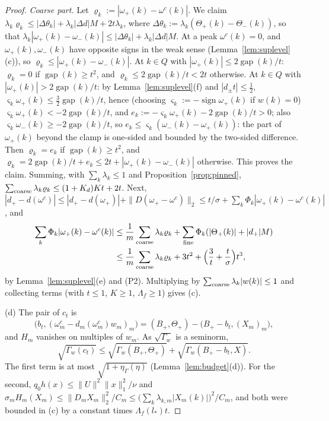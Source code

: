 \documentclass[10pt]{amsart}
\theoremstyle{definition}
\theoremstyle{remark}
\newcommand{\sgn}{\operatorname{sign}}
\newcommand{\gap}{\operatorname{gap}}
\begin{document}
\begin{proof}
\emph{Coarse part.}  Let $\varrho_k:=|\omega_+(k)-\omega^c(k)|$.  We claim
$\lambda_k\varrho_k\le|\Delta\theta_k|+\lambda_k|\Delta d|M+2t\lambda_k$, where
$\Delta\theta_k:=\lambda_k(\Theta_+(k)-\Theta_-(k))$, so that
$\lambda_k|\omega_+(k)-\omega_-(k)|\le|\Delta\theta_k|+\lambda_k|\Delta d|M$.
At a peak $\omega^c(k)=0$, and $\omega_+(k),\omega_-(k)$ have opposite signs
in the weak sense (Lemma~\ref{lem:suplevel}(c)), so $\varrho_k\le|\omega_+(k)-
\omega_-(k)|$.  At $k\in Q$ with $|\omega_+(k)|\le2\gap(k)/t$: $\varrho_k=0$ if
$\gap(k)\ge t^2$, and $\varrho_k\le2\gap(k)/t<2t$ otherwise.  At $k\in Q$ with
$|\omega_+(k)|>2\gap(k)/t$: by Lemma~\ref{lem:suplevel}(f) and $|d_\pm t|\le
\frac12$, $\varsigma_k\omega_+(k)\le\frac32\gap(k)/t$, hence (choosing
$\varsigma_k:=-\sgn\omega_+(k)$ if $w(k)=0$) $\varsigma_k\omega_+(k)<
-2\gap(k)/t$, and $e_k:=-\varsigma_k\omega_+(k)-2\gap(k)/t>0$; also
$\varsigma_k\omega_-(k)\ge-2\gap(k)/t$, so $e_k\le\varsigma_k(\omega_-(k)-
\omega_+(k))$: the part of $\omega_+(k)$ beyond the clamp is one-sided and
bounded by the two-sided difference.  Then $\varrho_k=e_k$ if $\gap(k)\ge t^2$,
and $\varrho_k=2\gap(k)/t+e_k\le2t+|\omega_+(k)-\omega_-(k)|$ otherwise.  This
proves the claim.  Summing, with $\sum_k\lambda_k\le1$ and
Proposition~\ref{prop:pinned}, $\sum_{\rm coarse}\lambda_k\varrho_k\le
(1+K_d)Kt+2t$.  Next, $|d_+-d(\omega^c)|\le|d_+-d(\omega_+)|+\|D(\omega_+-
\omega^c)\|_2\le t/\sigma+\sum_k\Phi_k|\omega_+(k)-\omega^c(k)|$, and
\begin{align*}
 \sum_k\Phi_k|\omega_+(k)-\omega^c(k)|&\le\frac1m\sum_{\rm coarse}
 \lambda_k\varrho_k+\sum_{\rm fine}\Phi_k(|\Theta_+(k)|+|d_+|M)\\
 &\le\frac1m\sum_{\rm coarse}\lambda_k\varrho_k+3t^2+\Big(\frac3t+\frac
 t\sigma\Big)t^3,
\end{align*}
by Lemma~\ref{lem:suplevel}(e) and (P2).  Multiplying by
$\sum_{\rm coarse}\lambda_k|w(k)|\le1$ and collecting terms (with $t\le1$,
$K\ge1$, $\Lambda_f\ge1$) gives (c).

(d) The pair of $c_t$ is
\[
 \big(b_t,(\omega^c_m-d_m(\omega^c_m)w_m)_m\big)=(B_+,\Theta_+)-\big(B_+-b_t,
 (X_m)_m\big),
\]
and $H_m$ vanishes on multiples of $w_m$.  As $\sqrt{\Gamma_w}$ is a
seminorm,
\[
 \sqrt{\Gamma_w(c_t)}\le\sqrt{\Gamma_w(B_+,\Theta_+)}+\sqrt{\Gamma_w(B_+-
 b_t,X)}.
\]
The first term is at most
$\sqrt{1+\eta_\Gamma(\eta)}$ (Lemma~\ref{lem:budget}(d)).  For the second,
$q_0h(x)\le\|U\|^2\|x\|_1^2/\nu$ and
$\sigma_mH_m(X_m)\le\|D_mX_m\|_2^2/C_m\le\big(\sum_k\lambda_{k,m}|X_m(k)|
\big)^2/C_m$, and both were bounded in (c) by a
constant times $\Lambda_f(l_*)t$.
\end{proof}
\end{document}
